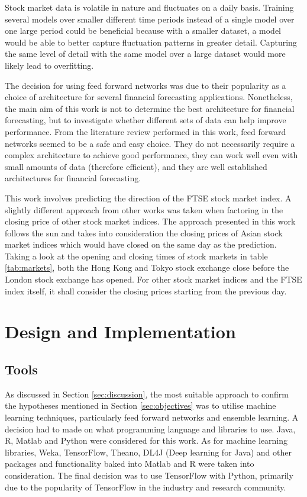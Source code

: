 \documentclass{UoYCSproject}
\begin{document}
Stock market data is volatile in nature and fluctuates on a daily basis. Training several models over smaller different time periods instead of a single model over one large period could be beneficial because with a smaller dataset, a model would be able to better capture fluctuation patterns in greater detail. Capturing the same level of detail with the same model over a large dataset would more likely lead to overfitting. 

The decision for using feed forward networks was due to their popularity as a choice of architecture for several financial forecasting applications. Nonetheless, the main aim of this work is not to determine the best architecture for financial forecasting, but to investigate whether different sets of data can help improve performance. From the literature review performed in this work, feed forward networks seemed to be a safe and easy choice. They do not necessarily require a complex architecture to achieve good performance, they can work well even with small amounts of data (therefore efficient), and they are well established architectures for financial forecasting.    

This work involves predicting the direction of the FTSE stock market index. A slightly different approach from other works was taken when factoring in the closing price of other stock market indices. The approach presented in this work follows the sun and takes into consideration the closing prices of Asian stock market indices which would have closed on the same day as the prediction. Taking a look at the opening and closing times of stock markets in table \ref{tab:markets}, both the Hong Kong and Tokyo stock exchange close before the London stock exchange has opened. For other stock market indices and the FTSE index itself, it shall consider the closing prices starting from the previous day.       

\chapter{Design and Implementation}
\section{Tools}
As discussed in Section \ref{sec:discussion}, the most suitable approach to confirm the hypotheses mentioned in Section \ref{sec:objectives} was to utilise machine learning techniques, particularly feed forward networks and ensemble learning. A decision had to made on what programming language and libraries to use. Java, R, Matlab and Python were considered for this work. As for machine learning libraries, Weka, TensorFlow, Theano, DL4J (Deep learning for Java) and other packages and functionality baked into Matlab and R were taken into consideration. The final decision was to use TensorFlow with Python, primarily due to the popularity of TensorFlow in the industry and research community. 
\end{document}
